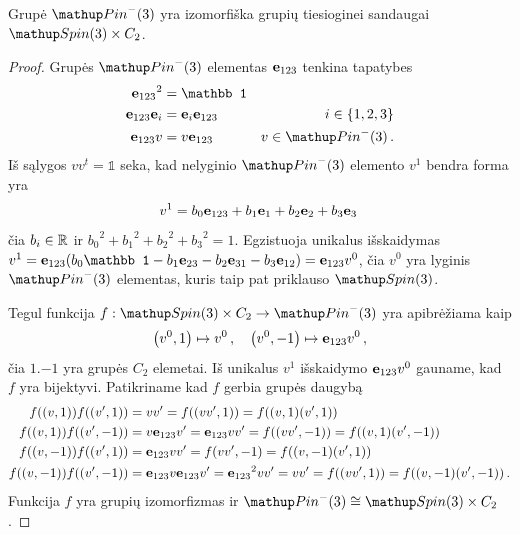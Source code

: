 \begin{proposition}
	Grupė $\pinm$ yra izomorfiška grupių tiesioginei sandaugai $\spin \times C_2$.
\end{proposition}
\begin{proof}
	Grupės $\pinm$ elementas $\vb e_{123}$ tenkina tapatybes
	\begin{align}
		{\vb e_{123}}^2 &= \mathbb1
		\\
		\vb e_{123} \vb e_i &= \vb e_i  \vb e_{123} \quad &i \in \qty{1,2,3}
		\\
		\vb e_{123} v &= v  \vb e_{123} \quad &v \in \pinm
		\,.
	\end{align}
	Iš sąlygos $vv^t = \mathbb1$ seka, kad nelyginio $\pinm$ elemento $v^1$ bendra forma yra
	\begin{equation}
		v^1 = 
		b_0 \vb e_{123}
		+ b_1 \vb e_1
		+ b_2 \vb e_2
		+ b_3 \vb e_3
		\,
	\end{equation}
	čia $b_i \in \mathbb{R}$ ir
	${b_0}^2 + {b_1}^2 + {b_2}^2 + {b_3}^2 = 1$.
	Egzistuoja unikalus išskaidymas
	$
	v^1 = \vb e_{123}
	\qty({
		b_0 \mathbb1
		- b_1 \vb e_{23}
		- b_2 \vb e_{31}
		- b_3 \vb e_{12}
	})
	= \vb e_{123} v^0
	$, čia $v^0$ yra lyginis $\pinm$ elementas,
	kuris taip pat priklauso $\spin$.

	Tegul funkcija $f: \spin \times C_2 \to \pinm$ yra apibrėžiama kaip
	\begin{equation}
		\qty(v^0,1) \mapsto v^0
		\,,\quad
		\qty(v^0, -1) \mapsto \vb e_{123} v^0
		\,,
	\end{equation}
	čia $\qty{1,-1}$ yra grupės $C_2$ elemetai.
	Iš unikalus $v^1$ išskaidymo $\vb e_{123} v^0$ gauname,
	kad $f$ yra bijektyvi.
	Patikriname kad $f$ gerbia grupės daugybą
	\begin{equation}
		\begin{aligned}
			f((v,1))f((v',1)) &= vv' = f((vv',1)) = f((v,1)(v',1))
			\\
			f((v,1))f((v',-1)) &= v\vb e_{123}v' = \vb e_{123}vv' = f((vv', -1)) = f((v,1)(v',-1))
			\\
			f((v,-1))f((v',1)) &= \vb e_{123}vv' = f(vv', -1) = f((v,-1)(v',1))
			\\
			f((v,-1))f((v',-1)) &= \vb e_{123}v\vb e_{123}v' = {\vb e_{123}}^2 vv' = vv'= f((vv', 1)) = f((v,-1)(v',-1))
			\,.
		\end{aligned}
	\end{equation}
	Funkcija $f$ yra grupių izomorfizmas ir $\pinm \cong \spin \times C_2$.
\end{proof}

